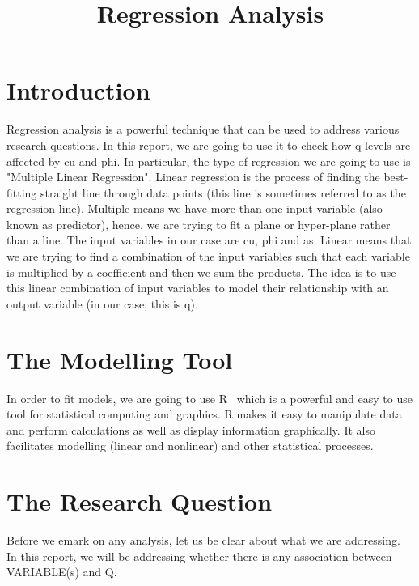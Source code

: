 \documentclass[a4paper,12pt, english]{article}
\begin{document}
\title{Regression Analysis}
\maketitle

\section{Introduction}
Regression analysis is a powerful technique that can be used to address various research questions. In this report, we are going to use it to check how q levels are affected by cu and phi. In particular, the type of regression we are going to use is "Multiple Linear Regression". Linear regression is the process of finding the best-fitting straight line through data points (this line is sometimes referred to as the regression line). Multiple means we have more than one input variable (also known as predictor), hence, we are trying to fit a plane or hyper-plane rather than a line.  The input variables in our case are cu, phi and as. Linear means that we are trying to find a combination of the input variables such that each variable is multiplied by a coefficient and then we sum the products. The idea is to use this linear combination of input variables to model their relationship with an output variable (in our case, this is q).

\section{The Modelling Tool}
In order to fit models, we are going to use R~\cite{R} which is a powerful and easy to use tool for statistical computing and graphics. R makes it easy to manipulate data and perform calculations as well as display information graphically. It also facilitates modelling (linear and nonlinear) and other statistical processes.


\section{The Research Question}
Before we emark on any analysis, let us be clear about what we are addressing.\\
In this report, we will be addressing whether there is any association between VARIABLE(s) and Q.
\end{document}
